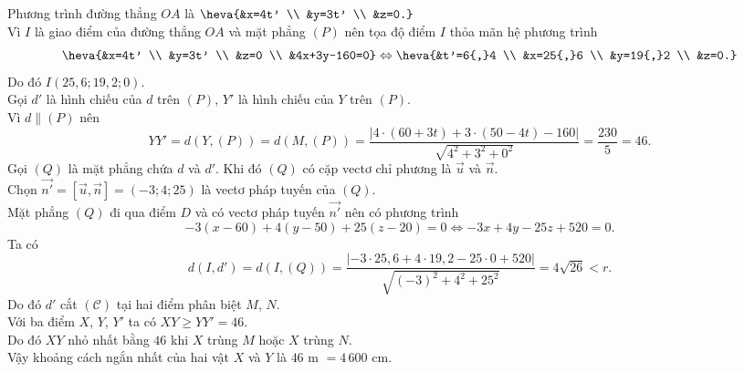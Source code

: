 \begin{ex}
{		Phương trình đường thẳng $OA$ là $\heva{&x=4t' \\ &y=3t' \\ &z=0.}$ \\
		Vì $I$ là giao điểm của đường thẳng $OA$ và mặt phẳng $(P)$ nên tọa độ điểm $I$ thỏa mãn hệ phương trình 
		\[\heva{&x=4t' \\ &y=3t' \\ &z=0 \\ &4x+3y-160=0} \Leftrightarrow \heva{&t'=6{,}4 \\ &x=25{,}6 \\ &y=19{,}2 \\ &z=0.}\]
		Do đó $I(25{,}6;19{,}2;0)$. \\
		Gọi $d'$ là hình chiếu của $d$ trên $(P)$, $Y'$ là hình chiếu của $Y$ trên $(P)$. \\
		Vì $d \parallel (P)$ nên 
		\[YY'=d(Y,(P))=d(M,(P))=\dfrac{|4 \cdot (60+3t)+3 \cdot (50-4t)-160|}{\sqrt{4^2+3^2+0^2}}=\frac{230}{5}=46.\]
		Gọi $(Q)$ là mặt phẳng chứa $d$ và $d'$. Khi đó $(Q)$ có cặp vectơ chỉ phương là $\overrightarrow{u}$ và $\overrightarrow{n}$. \\
		Chọn $\overrightarrow{n'}=\left[\overrightarrow{u},\overrightarrow{n}\right]=(-3;4;25)$ là vectơ pháp tuyến của $(Q)$. \\
		Mặt phẳng $(Q)$ đi qua điểm $D$ và có vectơ pháp tuyến $\overrightarrow{n'}$ nên có phương trình 
		\[-3(x-60)+4(y-50)+25(z-20)=0 \Leftrightarrow -3x+4y-25z+520=0.\]
		Ta có 
		\[d(I,d')=d(I,(Q))=\dfrac{|-3 \cdot 25{,}6+4 \cdot 19{,}2-25 \cdot 0+520|}{\sqrt{(-3)^2+4^2+25^2}}=4\sqrt{26}<r.\]
		Do đó $d'$ cắt $(\mathcal{C})$ tại hai điểm phân biệt $M$, $N$. \\
		Với ba điểm $X$, $Y$, $Y'$ ta có $XY \ge YY'=46$. \\
		Do đó $XY$ nhỏ nhất bằng $46$ khi $X$ trùng $M$ hoặc $X$ trùng $N$. \\
		Vậy khoảng cách ngắn nhất của hai vật $X$ và $Y$ là $46$ m $=4\,600$ cm.
	}
\end{ex}

